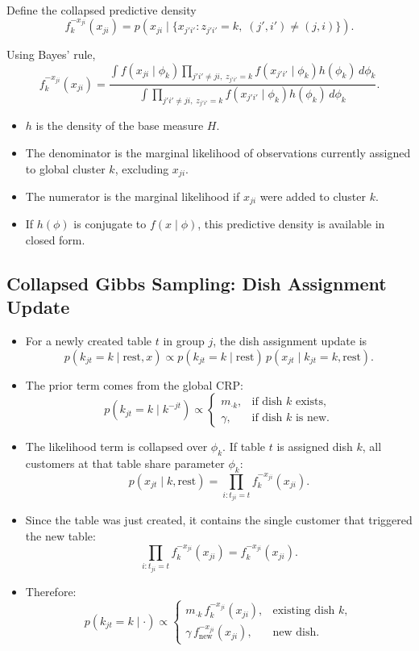 \documentclass[12pt,oneside]{book}
\numberwithin{equation}{section}
\theoremstyle{definition}
\theoremstyle{plain}
\theoremstyle{remark}
\begin{document}
Define the collapsed predictive density
\[
f_k^{-x_{ji}}(x_{ji})
=
p(x_{ji} \mid \{x_{j'i'} : z_{j'i'}=k,\; (j',i') \neq (j,i)\}).
\]

Using Bayes' rule,
\[
f_k^{-x_{ji}}(x_{ji})
=
\frac{
\int f(x_{ji}\mid \phi_k)
\prod_{j'i'\neq ji,\; z_{j'i'}=k}
f(x_{j'i'}\mid \phi_k)
h(\phi_k)\,d\phi_k
}{
\int
\prod_{j'i'\neq ji,\; z_{j'i'}=k}
f(x_{j'i'}\mid \phi_k)
h(\phi_k)\,d\phi_k
}.
\]

\begin{itemize}
\item $h$ is the density of the base measure $H$.

\item The denominator is the marginal likelihood of observations currently assigned to global cluster $k$, excluding $x_{ji}$.

\item The numerator is the marginal likelihood if $x_{ji}$ were added to cluster $k$.

\item If $h(\phi)$ is conjugate to $f(x\mid \phi)$, this predictive density is available in closed form.
\end{itemize}

\subsection*{Collapsed Gibbs Sampling: Dish Assignment Update}

\begin{itemize}
\item For a newly created table $t$ in group $j$, the dish assignment update is
\[
p(k_{jt}=k \mid \text{rest}, x)
\propto
p(k_{jt}=k \mid \text{rest})\,
p(x_{jt} \mid k_{jt}=k,\text{rest}).
\]

\item The prior term comes from the global CRP:
\[
p(k_{jt}=k \mid k^{-jt})
\propto
\begin{cases}
m_{\cdot k}, & \text{if dish } k \text{ exists}, \\
\gamma, & \text{if dish } k \text{ is new}.
\end{cases}
\]

\item The likelihood term is collapsed over $\phi_k$. If table $t$ is assigned dish $k$, all customers at that table share parameter $\phi_k$:
\[
p(x_{jt}\mid k,\text{rest})
=
\prod_{i:t_{ji}=t}
f_k^{-x_{ji}}(x_{ji}).
\]

\item Since the table was just created, it contains the single customer that triggered the new table:
\[
\prod_{i:t_{ji}=t} f_k^{-x_{ji}}(x_{ji})
=
f_k^{-x_{ji}}(x_{ji}).
\]

\item Therefore:
\[
p(k_{jt}=k \mid \cdot)
\propto
\begin{cases}
m_{\cdot k}\, f_k^{-x_{ji}}(x_{ji}), & \text{existing dish } k, \\
\gamma\, f_{\text{new}}^{-x_{ji}}(x_{ji}), & \text{new dish}.
\end{cases}
\]
\end{itemize}
\end{document}
